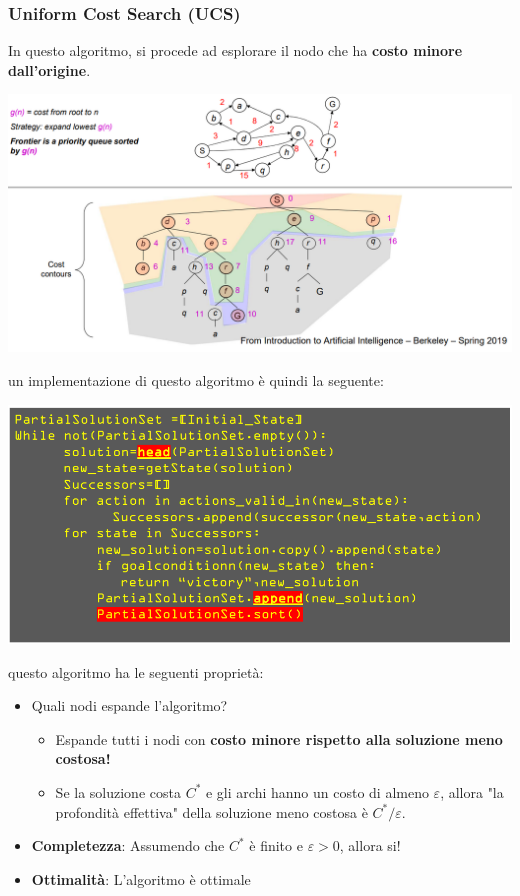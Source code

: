 \documentclass[12pt]{article}
\begin{document}
\subsubsection{Uniform Cost Search (UCS)}
In questo algoritmo, si procede ad esplorare il nodo che ha \textbf{costo minore dall'origine}.
\begin{center}
    \includegraphics[width = 0.90\linewidth]{Images/38.PNG}
\end{center}
un implementazione di questo algoritmo è quindi la seguente:
\begin{center}
    \includegraphics[width = 0.85\linewidth]{Images/39.PNG}
\end{center}
questo algoritmo ha le seguenti proprietà:
\begin{itemize}
    \item Quali nodi espande l'algoritmo?
    \begin{itemize}
        \item Espande tutti i nodi con \textbf{costo minore rispetto alla soluzione meno costosa!}
        \item Se la soluzione costa $C^*$ e gli archi hanno un costo di almeno $\varepsilon$, allora "la profondità effettiva" della soluzione meno costosa è $C^*/\varepsilon$.
    \end{itemize}
    \item \textbf{Completezza}: Assumendo che $C^*$ è finito e $\varepsilon > 0$, allora si!
    \item \textbf{Ottimalità}: L'algoritmo è ottimale
\end{itemize}
\end{document}
